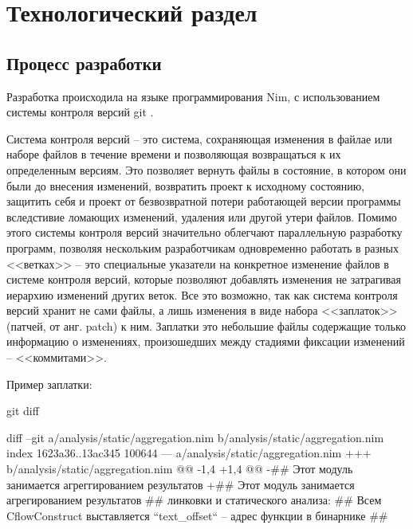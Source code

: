 \chapter{Технологический раздел}\label{ch:ch3}
\section{Процесс разработки {\ProgModule}}\label{sec:ch3/sec1}
Разработка {\ProgModule} происходила на языке программирования Nim,
с использованием системы контроля версий git \autocite{git}.

Система контроля версий -- это система, сохраняющая
изменения в файлае или наборе файлов в течение времени и позволяющая возвращаться к их
определенным версиям. 
Это позволяет вернуть файлы в состояние, в котором они были до внесения изменений,
возвратить проект к исходному состоянию, защитить себя и проект от безвозвратной потери
работающей версии программы вследстивие ломающих изменений, удаления или другой утери файлов.
Помимо этого системы контроля версий значительно облегчают параллельную разработку программ,
позволяя нескольким разработчикам одновременно работать в разных <<ветках>> -- 
это специальные указатели на конкретное изменение файлов в системе контроля версий,
которые позволяют добавлять изменения не затрагивая иерархию изменений других веток.
Все это возможно, так как система контроля версий хранит не сами файлы, а лишь
изменения в виде набора <<заплаток>> (патчей, от анг. patch) к ним. Заплатки это небольшие файлы
содержащие только информацию о изменениях, произошедших между стадиями фиксации изменений -- 
<<коммитами>>.

Пример заплатки:
\hspace{-3ex}
\begin{ListingEnv}[!h]
    \captiondelim{ }
    \caption{git diff}\label{lst:diff}
    \small
    \begin{Verb}[]
    diff --git a/analysis/static/aggregation.nim b/analysis/static/aggregation.nim
    index 1623a36..13ac345 100644
    --- a/analysis/static/aggregation.nim
    +++ b/analysis/static/aggregation.nim
    @@ -1,4 +1,4 @@
    -## Этот модуль занимается агреггированием результатов
    +## Этот модуль занимается агрегированием результатов
     ## линковки и статического анализа:
     ## Всем CflowConstruct выставляется ``text_offset`` -- адрес функции в бинарнике
     ##
    \end{Verb}
\end{ListingEnv}

